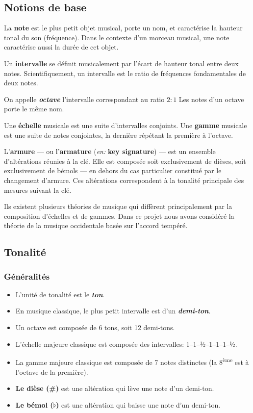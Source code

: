 \documentclass[french,]{article}
\providecommand{\tightlist}{%
  \setlength{\itemsep}{0pt}\setlength{\parskip}{0pt}}
\begin{document}
\hypertarget{notions-de-base}{%
\subsection{Notions de base}\label{notions-de-base}}

La \textbf{note} est le plus petit objet musical, porte un nom, et
caractérise la hauteur tonal du son (fréquence). Dans le contexte d'un
morceau musical, une note caractérise aussi la durée de cet objet.

Un \textbf{intervalle} se définit musicalement par l'écart de hauteur
tonal entre deux notes. Scientifiquement, un intervalle est le ratio de
fréquences fondamentales de deux notes.

On appelle \textbf{\emph{octave}} l'intervalle correspondant au ratio
\(2:1\) Les notes d'un octave porte le même nom.

Une \textbf{échelle} musicale est une suite d'intervalles conjoints. Une
\textbf{gamme} musicale est une suite de notes conjointes, la dernière
répétant la première à l'octave.

L'\textbf{armure} --- ou l'\textbf{armature} (\emph{en:} \textbf{key
signature}) --- est un ensemble d'altérations réunies à la clé. Elle est
composée soit exclusivement de dièses, soit exclusivement de bémols ---
en dehors du cas particulier constitué par le changement d'armure. Ces
altérations correspondent à la tonalité principale des mesures suivant
la clé.

Ils existent plusieurs théories de musique qui diffèrent principalement
par la composition d'échelles et de gammes. Dans ce projet nous avons
considéré la théorie de la musique occidentale basée sur l'accord
tempéré.

\hypertarget{tonalite}{%
\subsection{Tonalité}\label{tonalite}}

\hypertarget{generalites}{%
\subsubsection{Généralités}\label{generalites}}

\begin{itemize}
\tightlist
\item
  L'unité de tonalité est le \textbf{\emph{ton}}.
\item
  En musique classique, le plus petit intervalle est d'un
  \textbf{\emph{demi-ton}}.
\item
  Un octave est composée de 6 tons, soit 12 demi-tons.
\item
  L'échelle majeure classique est composée des intervalles:
  1--1--½--1--1--1--½.
\item
  La gamme majeure classique est composée de 7 notes distinctes (la
  8\textsuperscript{ème} est à l'octave de la première).
\item
  \textbf{Le dièse (\#)} est une altération qui lève une note d'un
  demi-ton.
\item
  \textbf{Le bémol (\(\flat\))} est une altération qui baisse une note
  d'un demi-ton.
\end{itemize}
\end{document}
